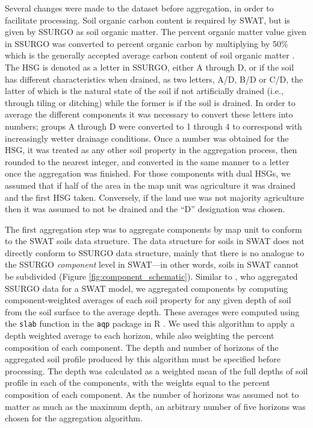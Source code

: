Several changes were made to the dataset before aggregation, in order to
facilitate processing. Soil organic carbon content is required by SWAT, but is
given by SSURGO as soil organic matter. The percent organic matter value given in SSURGO
was converted to percent organic carbon by multiplying by 50\% which is the generally accepted average carbon content of soil organic matter \citep{brady_elements_2004}. The HSG is
denoted as a letter in SSURGO, either A through D, or if the soil has different
characteristics when drained, as two letters, A/D, B/D or C/D, the latter of
which is the natural state of the soil if not artificially drained (i.e.,
through tiling or ditching) while the former is if the soil is drained.
In order to average the different components it was necessary to convert these letters
into numbers; groups A through D were converted to 1 through 4 to correspond
with increasingly wetter drainage conditions. Once a number was obtained for the
HSG, it was treated as any other soil property in the aggregation process,
then rounded to the nearest integer, and converted in the same manner to a letter
once the aggregation was finished. For those components with dual HSGs, we
assumed that if half of the area in the map unit was agriculture it was drained
and the first HSG taken. Conversely, if the land use was not majority agriculture
then it was assumed to not be drained and the ``D'' designation was chosen.

The first aggregation step was to aggregate components by map unit to conform to
the SWAT soils data structure. The data structure for soils in SWAT does not
directly conform to SSURGO data structure, mainly that there is no analogue to the
SSURGO \textit{component} level in SWAT---in other words, soils in SWAT cannot
be subdivided (Figure \ref{fig:component_schematic}). 
Similar to \citet{gatzke_aggregation_2011}, who aggregated SSURGO data for a SWAT model, 
we aggregated components by computing
component-weighted averages of each soil property for any given depth of soil from the soil surface to the average depth.
These averages were computed using the \texttt{slab} function in the \texttt{aqp} package in R \citep{beaudette_algorithms_2013}. We
used this algorithm to apply a depth weighted average to each horizon, while
also weighting the percent composition of each component. The depth and number of horizons of
the aggregated soil profile produced by this algorithm must be specified before
processing. The depth was calculated as a weighted mean of the full depths of
soil profile in each of the components, with the weights equal to the percent composition of each
component. As the number of horizons was assumed not to matter as much as the
maximum depth, an arbitrary number of five horizons was chosen for the
aggregation algorithm.

